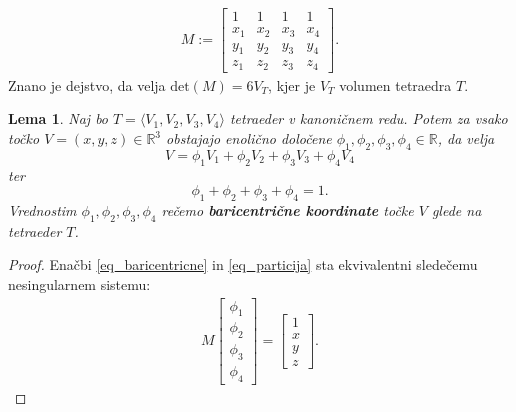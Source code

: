 \documentclass[11pt,a4paper]{article}
\newtheorem{lemma}{Lema}
\begin{document}
\begin{align}
    M := \begin{bmatrix}
        1 & 1 & 1 & 1 \\
        x_1 & x_2 & x_3 & x_4 \\
        y_1 & y_2 & y_3 & y_4 \\
        z_1 & z_2 & z_3 & z_4
    \end{bmatrix}.
\end{align}
Znano je dejstvo, da velja $\text{det}(M) = 6V_T$, kjer je $V_T$ volumen tetraedra $T$. 


\begin{lemma}\label{lema_baricentricne}
    Naj bo $T = \langle V_1, V_2, V_3, V_4 \rangle$ tetraeder v kanoničnem redu.
    Potem za vsako točko $V = (x,y,z) \in \mathbb{R}^3$ obstajajo enolično določene
     $\phi_1, \phi_2, \phi_3, \phi_4 \in \mathbb{R}$,
    da velja 
    \begin{equation}\label{eq_baricentricne}
        V = \phi_1 V_1 + \phi_2 V_2 + \phi_3 V_3 + \phi_4 V_4
    \end{equation} ter 
    \begin{equation}\label{eq_particija}
        \phi_1 + \phi_2 + \phi_3 + \phi_4 = 1 .
    \end{equation}
    Vrednostim $\phi_1, \phi_2, \phi_3, \phi_4$ rečemo \textbf{baricentrične 
    koordinate} točke $V$ glede na tetraeder $T$.
\end{lemma}

\begin{proof}
    Enačbi \ref{eq_baricentricne} in \ref{eq_particija} sta ekvivalentni
    sledečemu nesingularnem sistemu:
    \begin{align}
        M \begin{bmatrix}\phi_1 \\ \phi_2 \\ \phi_3 \\ \phi_4 \end{bmatrix} = \begin{bmatrix}
            1 \\ x \\ y \\ z \end{bmatrix}.
    \end{align}
\end{proof}
\end{document}

